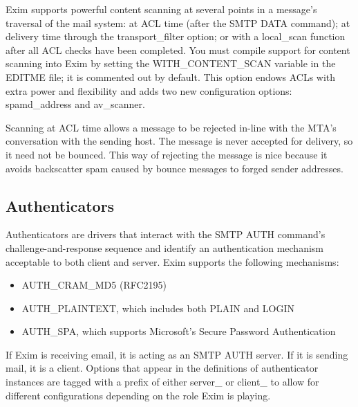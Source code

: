 Exim supports powerful content scanning at several points in a message's
traversal of the mail system: at ACL time (after the SMTP DATA command);
at delivery time through the {transport\_filter} option; or with a
{local\_scan} function after all ACL checks have been completed. You
must compile support for content scanning into Exim by setting the
{WITH\_CONTENT\_SCAN} variable in the {EDITME} file; it is commented out
by default. This option endows ACLs with extra power and flexibility and
adds two new configuration options: {spamd\_address} and {av\_scanner}.

Scanning at ACL time allows a message to be rejected in-line with the
MTA's conversation with the sending host. The message is never accepted
for delivery, so it need not be bounced. This way of rejecting the
message is nice because it avoids backscatter spam caused by bounce
messages to forged sender addresses.

\protect\hypertarget{part0026_split_049.html}{}{}

\hypertarget{part0026_split_049.htmlux5cux23_idContainer1247}{}
\hypertarget{part0026_split_049.htmlux5cux23calibre_pb_48}{%
\subsection[Authenticators]{\texorpdfstring{\protect\hypertarget{part0026_split_049.htmlux5cux23_idTextAnchor1144}{}{}Auth\protect\hypertarget{part0026_split_049.htmlux5cux23_idTextAnchor1145}{}{}enticators}{Authenticators}}\label{part0026_split_049.htmlux5cux23calibre_pb_48}}

\protect\hypertarget{part0026_split_049.htmlux5cux23_idIndexMarker2652}{}{}Authenticators
are drivers that interact with the SMTP AUTH command's
challenge-and-response sequence and identify an authentication mechanism
acceptable to both client and server. Exim supports the following
mechanisms:

\begin{itemize}
\item
  {AUTH\_CRAM\_MD5} (RFC2195)
\item
  {AUTH\_PLAINTEXT}, which includes both PLAIN and LOGIN
\item
  {AUTH\_SPA}, which supports Microsoft's Secure Password Authentication
\end{itemize}

If Exim is receiving email, it is acting as an SMTP AUTH server. If it
is sending mail, it is a client. Options that appear in the definitions
of authenticator instances are tagged with a prefix of either {server\_}
or {client\_} to allow for different configurations depending on the
role Exim is playing.

